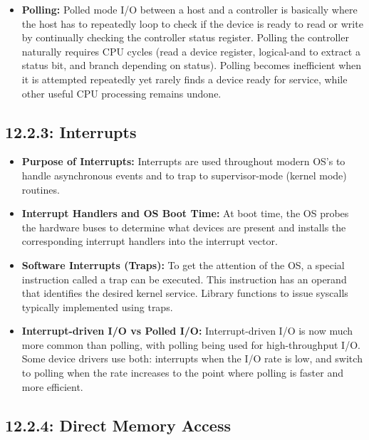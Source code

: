 \documentclass[12pt]{article}
\begin{document}
\begin{itemize}
    \item \textbf{Polling:} Polled mode I/O between a host and a controller is basically where the host has to repeatedly loop to check if the device is ready to read or write by continually checking the controller status register. Polling the controller naturally requires CPU cycles (read a device register, logical-and to extract a status bit, and branch depending on status). Polling becomes inefficient when it is attempted repeatedly yet rarely finds a device ready for service, while other useful CPU processing remains undone.
\end{itemize}

\subsection*{12.2.3: Interrupts}

\begin{itemize}
    \item \textbf{Purpose of Interrupts:} Interrupts are used throughout modern OS's to handle asynchronous events and to trap to supervisor-mode (kernel mode) routines.
    \item \textbf{Interrupt Handlers and OS Boot Time:} At boot time, the OS probes the hardware buses to determine what devices are present and installs the corresponding interrupt handlers into the interrupt vector.
    \item \textbf{Software Interrupts (Traps):} To get the attention of the OS, a special instruction called a trap can be executed. This instruction has an operand that identifies the desired kernel service. Library functions to issue syscalls typically implemented using traps.
    \item \textbf{Interrupt-driven I/O vs Polled I/O:} Interrupt-driven I/O is now much more common than polling, with polling being used for high-throughput I/O. Some device drivers use both: interrupts when the I/O rate is low, and switch to polling when the rate increases to the point where polling is faster and more efficient.
\end{itemize}

\subsection*{12.2.4: Direct Memory Access}
\end{document}
